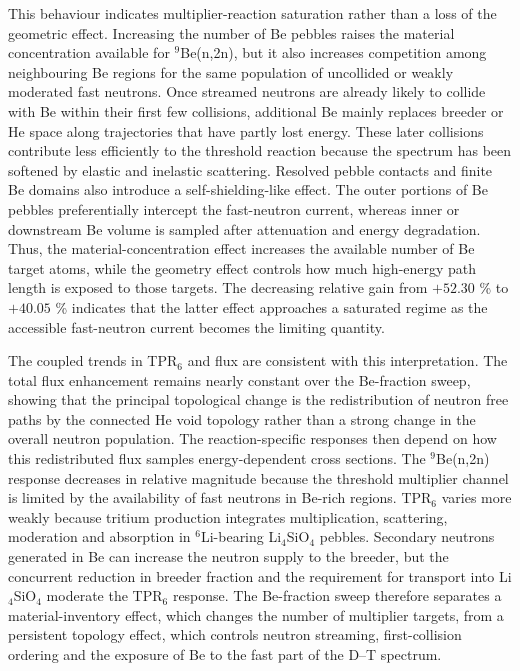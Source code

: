 \documentclass[preprint,12pt]{elsarticle}
\begin{document}
This behaviour indicates multiplier-reaction saturation rather than a loss of
the geometric effect.  Increasing the number of Be pebbles raises the material
concentration available for $^9$Be(n,2n), but it also increases competition
among neighbouring Be regions for the same population of uncollided or weakly
moderated fast neutrons.  Once streamed neutrons are already likely to collide
with Be within their first few collisions, additional Be mainly replaces
breeder or He space along trajectories that have partly lost energy.  These
later collisions contribute less efficiently to the threshold reaction because
the spectrum has been softened by elastic and inelastic scattering.  Resolved
pebble contacts and finite Be domains also introduce a self-shielding-like
effect.  The outer portions of Be pebbles preferentially intercept the
fast-neutron current, whereas inner or downstream Be volume is sampled after
attenuation and energy degradation.  Thus, the material-concentration effect
increases the available number of Be target atoms, while the geometry effect
controls how much high-energy path length is exposed to those targets.  The
decreasing relative gain from $+52.30$ \% to $+40.05$ \% indicates that the latter
effect approaches a saturated regime as the accessible fast-neutron current
becomes the limiting quantity.

The coupled trends in TPR$_6$ and flux are consistent with this interpretation.
The total flux enhancement remains nearly constant over the Be-fraction sweep,
showing that the principal topological change is the redistribution of neutron
free paths by the connected He void topology rather than a strong change in the
overall neutron population.  The reaction-specific responses then depend on how
this redistributed flux samples energy-dependent cross sections.  The
$^9$Be(n,2n) response decreases in relative magnitude because the threshold
multiplier channel is limited by the availability of fast neutrons in Be-rich
regions.  TPR$_6$ varies more weakly because tritium production integrates
multiplication, scattering, moderation and absorption in $^6$Li-bearing
Li$_4$SiO$_4$ pebbles.  Secondary neutrons generated in Be can increase the
neutron supply to the breeder, but the concurrent reduction in breeder fraction
and the requirement for transport into Li$_4$SiO$_4$ moderate the TPR$_6$ response.
The Be-fraction sweep therefore separates a material-inventory effect, which
changes the number of multiplier targets, from a persistent topology effect,
which controls neutron streaming, first-collision ordering and the exposure of
Be to the fast part of the D--T spectrum.
\end{document}
